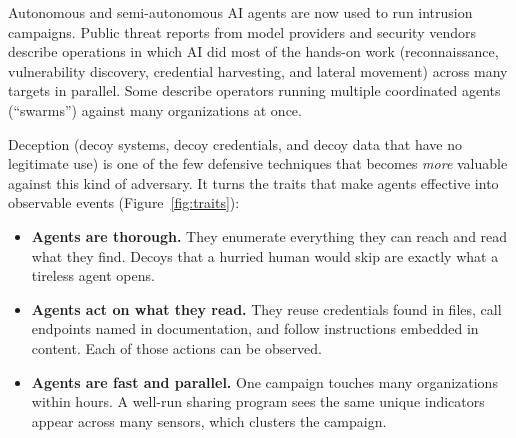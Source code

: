 \documentclass[11pt,letterpaper]{article}
\begin{document}
Autonomous and semi-autonomous AI agents are now used to run intrusion campaigns. Public threat reports from model providers and security vendors describe operations in which AI did most of the hands-on work (reconnaissance, vulnerability discovery, credential harvesting, and lateral movement) across many targets in parallel. Some describe operators running multiple coordinated agents (``swarms'') against many organizations at once.

Deception (decoy systems, decoy credentials, and decoy data that have no legitimate use) is one of the few defensive techniques that becomes \emph{more} valuable against this kind of adversary. It turns the traits that make agents effective into observable events (Figure~\ref{fig:traits}):

\begin{itemize}
  \item \textbf{Agents are thorough.} They enumerate everything they can reach and read what they find. Decoys that a hurried human would skip are exactly what a tireless agent opens.
  \item \textbf{Agents act on what they read.} They reuse credentials found in files, call endpoints named in documentation, and follow instructions embedded in content. Each of those actions can be observed.
  \item \textbf{Agents are fast and parallel.} One campaign touches many organizations within hours. A well-run sharing program sees the same unique indicators appear across many sensors, which clusters the campaign.
\end{itemize}
\end{document}
